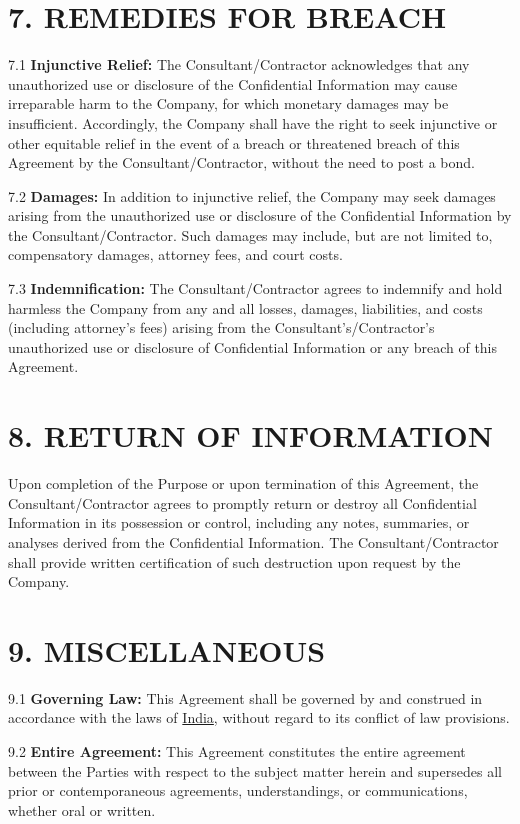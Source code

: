 \documentclass[12pt]{article}
\begin{document}
\section*{7. REMEDIES FOR BREACH}

7.1 \textbf{Injunctive Relief:} The Consultant/Contractor acknowledges that any unauthorized use or disclosure of the Confidential Information may cause irreparable harm to the Company, for which monetary damages may be insufficient. Accordingly, the Company shall have the right to seek injunctive or other equitable relief in the event of a breach or threatened breach of this Agreement by the Consultant/Contractor, without the need to post a bond.

7.2 \textbf{Damages:} In addition to injunctive relief, the Company may seek damages arising from the unauthorized use or disclosure of the Confidential Information by the Consultant/Contractor. Such damages may include, but are not limited to, compensatory damages, attorney fees, and court costs.

7.3 \textbf{Indemnification:} The Consultant/Contractor agrees to indemnify and hold harmless the Company from any and all losses, damages, liabilities, and costs (including attorney’s fees) arising from the Consultant’s/Contractor’s unauthorized use or disclosure of Confidential Information or any breach of this Agreement.

\section*{8. RETURN OF INFORMATION}

Upon completion of the Purpose or upon termination of this Agreement, the Consultant/Contractor agrees to promptly return or destroy all Confidential Information in its possession or control, including any notes, summaries, or analyses derived from the Confidential Information. The Consultant/Contractor shall provide written certification of such destruction upon request by the Company.

\section*{9. MISCELLANEOUS}

9.1 \textbf{Governing Law:} This Agreement shall be governed by and construed in accordance with the laws of \underline{India}, without regard to its conflict of law provisions.

9.2 \textbf{Entire Agreement:} This Agreement constitutes the entire agreement between the Parties with respect to the subject matter herein and supersedes all prior or contemporaneous agreements, understandings, or communications, whether oral or written.
\end{document}
